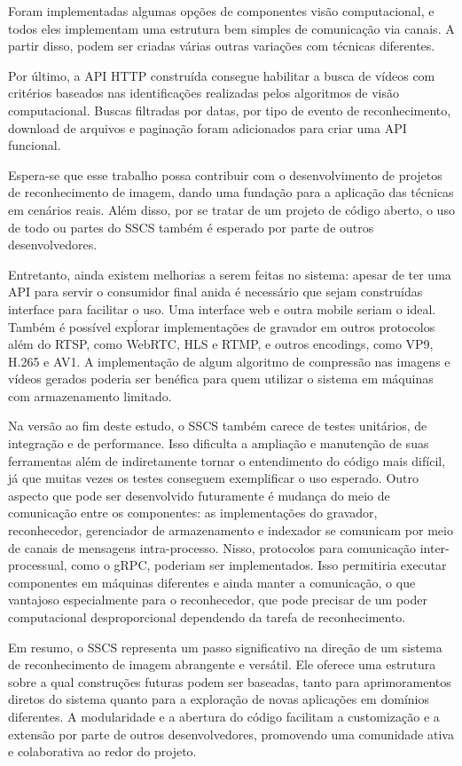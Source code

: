 \documentclass[12pt, %
openright, 
oneside, %
a4paper,    %
brazil]{facom-ufu-abntex2}
\begin{document}
Foram implementadas algumas opções de componentes visão computacional, e todos
eles implementam uma estrutura bem simples de comunicação via canais. A partir
disso, podem ser criadas várias outras variações com técnicas diferentes.

Por último, a API HTTP construída consegue habilitar a busca de vídeos com
critérios baseados nas identificações realizadas pelos algoritmos de visão
computacional. Buscas filtradas por datas, por tipo de evento de
reconhecimento, download de arquivos e paginação foram adicionados para criar
uma API funcional.

Espera-se que esse trabalho possa contribuir com o desenvolvimento de projetos
de reconhecimento de imagem, dando uma fundação para a aplicação das técnicas
em cenários reais. Além disso, por se tratar de um projeto de código aberto, o
uso de todo ou partes do SSCS também é esperado por parte de outros
desenvolvedores.

Entretanto, ainda existem melhorias a serem feitas no sistema: apesar de ter
uma API para servir o consumidor final anida é necessário que sejam construídas
interface para facilitar o uso. Uma interface web e outra mobile seriam o
ideal. Também é possível expĺorar implementações de gravador em outros
protocolos além do RTSP, como WebRTC, HLS e RTMP, e outros encodings, como VP9,
H.265 e AV1. A implementação de algum algoritmo de compressão nas imagens e
vídeos gerados poderia ser benéfica para quem utilizar o sistema em máquinas
com armazenamento limitado.

Na versão ao fim deste estudo, o SSCS também carece de testes unitários, de
integração e de performance. Isso dificulta a ampliação e manutenção de suas
ferramentas além de indiretamente tornar o entendimento do código mais difícil,
já que muitas vezes os testes conseguem exemplificar o uso esperado. Outro
aspecto que pode ser desenvolvido futuramente é mudança do meio de comunicação
entre os componentes: as implementações do gravador, reconhecedor, gerenciador
de armazenamento e indexador se comunicam por meio de canais de mensagens
intra-processo. Nisso, protocolos para comunicação inter-processual, como o
gRPC, poderiam ser implementados. Isso permitiria executar componentes em
máquinas diferentes e ainda manter a comunicação, o que vantajoso especialmente
para o reconhecedor, que pode precisar de um poder computacional
desproporcional dependendo da tarefa de reconhecimento.

Em resumo, o SSCS representa um passo significativo na direção de um sistema de
reconhecimento de imagem abrangente e versátil. Ele oferece uma estrutura sobre
a qual construções futuras podem ser baseadas, tanto para aprimoramentos
diretos do sistema quanto para a exploração de novas aplicações em domínios
diferentes. A modularidade e a abertura do código facilitam a customização e a
extensão por parte de outros desenvolvedores, promovendo uma comunidade ativa e
colaborativa ao redor do projeto.
\end{document}
